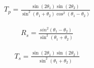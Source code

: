 \begin{align}
T_p=\frac{\sin(2\theta_1)\sin(2\theta_2)}{\sin^2(\theta_1+\theta_2)\cos^2(\theta_1-\theta_2)}
\end{align}

\begin{align}
R_s = \frac{sin^2(\theta_1-\theta_2)}{\sin^2(\theta_1+\theta_2)}
\end{align}

\begin{align}
T_s = \frac{\sin(2\theta_1)\sin(2\theta_2)}{\sin^2(\theta_1+\theta_2)}
\end{align}

	







